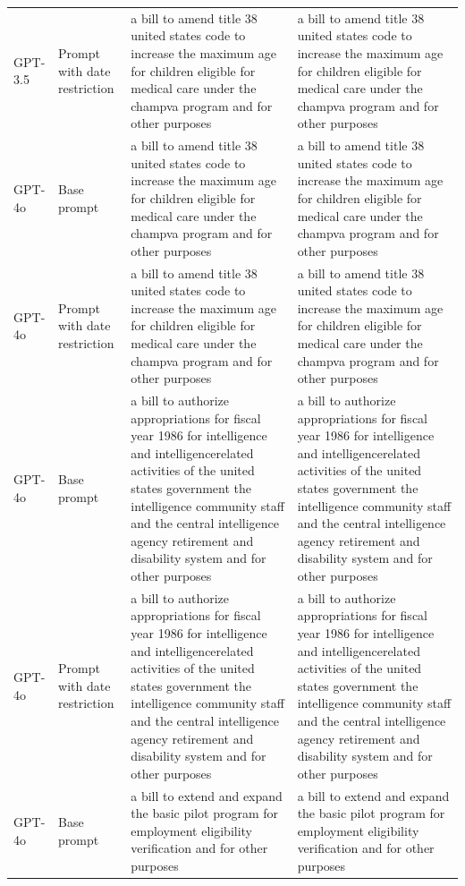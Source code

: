 \begin{longtable}{>{\raggedright\arraybackslash}p{1.4cm}>{\raggedright\arraybackslash}p{1.4cm}>{\raggedright\arraybackslash}p{5.5cm}>{\raggedright\arraybackslash}p{5.5cm}}
GPT-3.5 & Prompt with date restriction & a bill to amend title 38 united states code to increase the maximum age for children eligible for medical care under the champva program and for other purposes & a bill to amend title 38 united states code to increase the maximum age for children eligible for medical care under the champva program and for other purposes\\
GPT-4o & Base prompt & a bill to amend title 38 united states code to increase the maximum age for children eligible for medical care under the champva program and for other purposes & a bill to amend title 38 united states code to increase the maximum age for children eligible for medical care under the champva program and for other purposes\\
GPT-4o & Prompt with date restriction & a bill to amend title 38 united states code to increase the maximum age for children eligible for medical care under the champva program and for other purposes & a bill to amend title 38 united states code to increase the maximum age for children eligible for medical care under the champva program and for other purposes\\
GPT-4o & Base prompt & a bill to authorize appropriations for fiscal year 1986 for intelligence and intelligencerelated activities of the united states government the intelligence community staff and the central intelligence agency retirement and disability system and for other purposes & a bill to authorize appropriations for fiscal year 1986 for intelligence and intelligencerelated activities of the united states government the intelligence community staff and the central intelligence agency retirement and disability system and for other purposes\\
GPT-4o & Prompt with date restriction & a bill to authorize appropriations for fiscal year 1986 for intelligence and intelligencerelated activities of the united states government the intelligence community staff and the central intelligence agency retirement and disability system and for other purposes & a bill to authorize appropriations for fiscal year 1986 for intelligence and intelligencerelated activities of the united states government the intelligence community staff and the central intelligence agency retirement and disability system and for other purposes\\
GPT-4o & Base prompt & a bill to extend and expand the basic pilot program for employment eligibility verification and for other purposes & a bill to extend and expand the basic pilot program for employment eligibility verification and for other purposes\\

\end{longtable}
